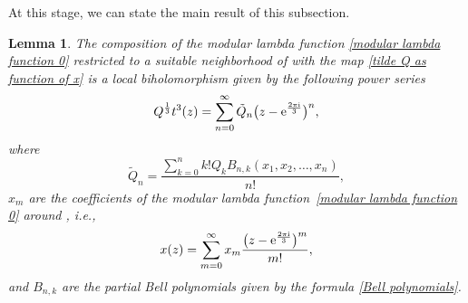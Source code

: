 \documentclass[11pt]{article}
\numberwithin{equation}{section}
\numberwithin{equation}{section}
\newtheorem{Lemma}[Theorem]{Lemma}
\begin{document}
At this stage, we can state the main result of this subsection.


\begin{Lemma}\label{t3 geometric interpretation}
 The composition of the modular lambda function \eqref{modular lambda function 0} restricted to a suitable neighborhood of  with the map \eqref{tilde Q as function of x} is a local biholomorphism given by the following power series
 \begin{gather}
 Q^{\frac{1}{3}}t^3(z) = \sum_{n=0}^{\infty}\tilde Q_n \bigl(z - {\rm e}^{\frac{2\pi {\rm i}}{3}} \bigr)^n,\label{local biholomorphism tildeQ to z}
 \end{gather}
 where
\[
 \tilde Q_n = \frac{ \sum_{k=0}^{n} k! Q_k B_{n,k} (x_1,x_2,\dots,x_n)}{n!},
 \]
 $x_m$ are the coefficients of the modular lambda function~\eqref{modular lambda function 0} around , i.e.,
 \begin{gather*}
 x(z) = \sum_{m=0}^{\infty} x_m \frac{\bigl( z - {\rm e}^{\frac{2\pi {\rm i}}{3}} \bigr)^m}{m!},
 \end{gather*}
 and $B_{n,k}$ are the partial Bell polynomials given by the formula \eqref{Bell polynomials}.
\end{Lemma}
\end{document}
